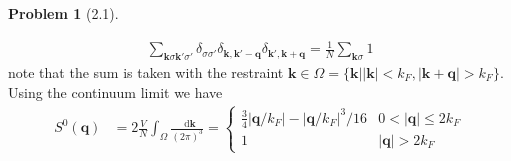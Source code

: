 \documentclass[twoside,11pt]{article}
\renewcommand*\d{\mathop{}\!\mathrm{d}}
\theoremstyle{definition}
\newtheorem{problem}{Problem}
\theoremstyle{remark}
\begin{document}
\begin{problem}[2.1]
\begin{enumerate}[label=(\alph*)]
\begin{align*}
    \sum_{\mathbf{k}\sigma\mathbf{k}'\sigma'}
    \delta_{\sigma\sigma'}\delta_{\mathbf{k},\mathbf{k}'-\mathbf{q}}
    \delta_{\mathbf{k}',\mathbf{k}+\mathbf{q}}
    =
    \frac{1}{N}
    \sum_{\mathbf{k}\sigma} 1
\end{align*}
note that the sum is taken with the restraint
$\mathbf{k}\in\Omega = \{\mathbf{k}||\mathbf{k}|<k_F, |\mathbf{k}+\mathbf{q}|>k_F\}$.
Using the continuum limit we have
\begin{align*}
    S^0(\mathbf{q}) &= 
    2\frac{V}{N}\int_\Omega \frac{\d\mathbf{k}}{(2\pi)^3}
    = \begin{cases}
        \frac{3}{4}|\mathbf{q}/k_F| - |\mathbf{q}/k_F|^3/16 & 0 < |\mathbf{q}| \leq 2k_F\\
        1 & |\mathbf{q}| > 2k_F
    \end{cases}
\end{align*}

\end{enumerate}
\end{problem}
\end{document}
